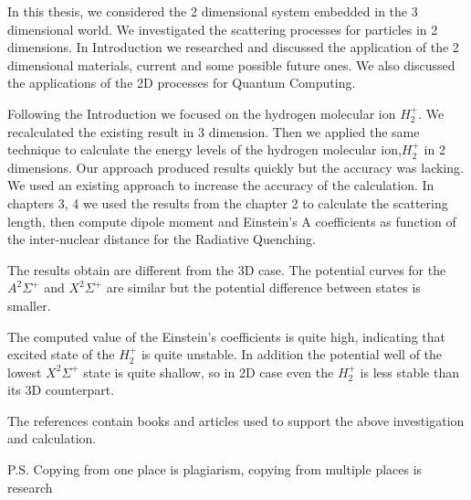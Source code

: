 
\label{conclusion}

In this thesis, we considered the 2 dimensional system embedded in the 3 dimensional world. We investigated the scattering processes for particles in 2 dimensions. In Introduction we researched and discussed the application of the 2 dimensional materials, current and some possible future ones. We also discussed the applications of the 2D processes for Quantum Computing.

Following the Introduction we focused on the hydrogen molecular ion $ H_2^{+} $. We recalculated the existing result in 3 dimension. 
Then we applied the same technique to calculate the energy levels of the hydrogen molecular ion,$ H_2^{+} $ in 2 dimensions. Our approach produced results quickly but the accuracy was lacking. We used an existing approach to increase the accuracy of the calculation. In chapters 3, 4 we used the results from the chapter 2 to calculate the scattering length, then compute dipole moment and Einstein's A coefficients as function of the inter-nuclear distance for the Radiative Quenching.

The results obtain are different from the 3D case. The potential curves for the $ A^2\Sigma^+ $ and $X^2\Sigma^+ $ are similar but the potential difference between states is smaller. 

The computed value of the Einstein's coefficients is quite high, indicating that excited state of the $ H_2^{+} $ is quite unstable. In addition the potential well of the lowest $ X^2\Sigma^+ $ state is quite shallow, so in 2D case even the  $ H_2^{+} $ is less stable than its 3D counterpart.  

The references contain books and articles used to support the above investigation and calculation.

P.S.
Copying from one place is plagiarism, copying from multiple places is research


